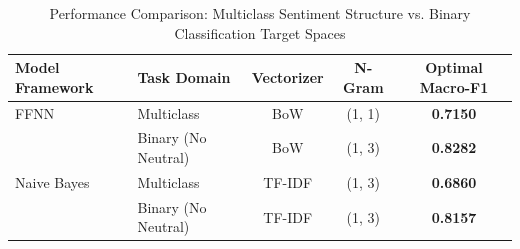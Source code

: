 \begin{table}[htbp]
    \centering
    \caption{Performance Comparison: Multiclass Sentiment Structure vs. Binary Classification Target Spaces}
    \label{tab:multiclass_binary_comparison}
    \small
    \begin{tabular}{llccc}
    \toprule
    \textbf{Model Framework} & \textbf{Task Domain} & \textbf{Vectorizer} & \textbf{N-Gram} & \textbf{Optimal Macro-F1} \\
    \midrule
    FFNN & Multiclass & BoW & (1, 1) & \textbf{0.7150} \\
     & Binary (No Neutral) & BoW & (1, 3) & \textbf{0.8282} \\
    \midrule
    Naive Bayes & Multiclass & TF-IDF & (1, 3) & \textbf{0.6860} \\
     & Binary (No Neutral) & TF-IDF & (1, 3) & \textbf{0.8157} \\
    \bottomrule
    \end{tabular}
\end{table}

